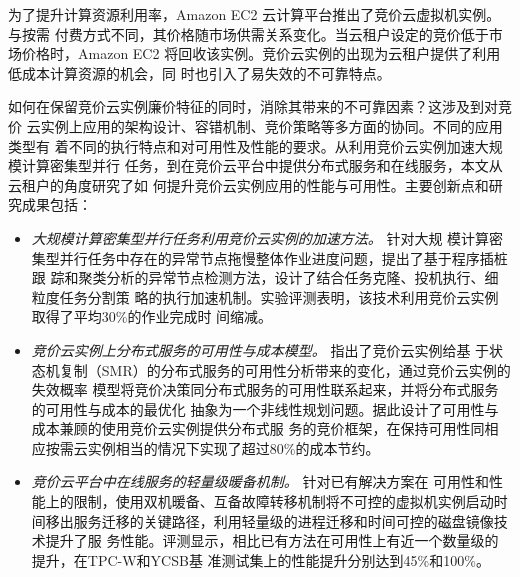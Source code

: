 \begin{cabstract}
  为了提升计算资源利用率，Amazon EC2 云计算平台推出了竞价云虚拟机实例。与按需
  付费方式不同，其价格随市场供需关系变化。当云租户设定的竞价低于市场价格时，Amazon 
  EC2 将回收该实例。竞价云实例的出现为云租户提供了利用低成本计算资源的机会，同
  时也引入了易失效的不可靠特点。

  如何在保留竞价云实例廉价特征的同时，消除其带来的不可靠因素？这涉及到对竞价
  云实例上应用的架构设计、容错机制、竞价策略等多方面的协同。不同的应用类型有
  着不同的执行特点和对可用性及性能的要求。从利用竞价云实例加速大规模计算密集型并行
  任务，到在竞价云平台中提供分布式服务和在线服务，本文从云租户的角度研究了如
  何提升竞价云实例应用的性能与可用性。主要创新点和研究成果包括：
  \begin{itemize}
    \item \emph{大规模计算密集型并行任务利用竞价云实例的加速方法。} 针对大规
    模计算密集型并行任务中存在的异常节点拖慢整体作业进度问题，提出了基于程序插桩跟
    踪和聚类分析的异常节点检测方法，设计了结合任务克隆、投机执行、细粒度任务分割策
    略的执行加速机制。实验评测表明，该技术利用竞价云实例取得了平均30\%的作业完成时
    间缩减。
    \item \emph{竞价云实例上分布式服务的可用性与成本模型。} 指出了竞价云实例给基
    于状态机复制（SMR）的分布式服务的可用性分析带来的变化，通过竞价云实例的失效概率
    模型将竞价决策同分布式服务的可用性联系起来，并将分布式服务的可用性与成本的最优化
    抽象为一个非线性规划问题。据此设计了可用性与成本兼顾的使用竞价云实例提供分布式服
    务的竞价框架，在保持可用性同相应按需云实例相当的情况下实现了超过80\%的成本节约。
    \item \emph{竞价云平台中在线服务的轻量级暖备机制。} 针对已有解决方案在
    可用性和性能上的限制，使用双机暖备、互备故障转移机制将不可控的虚拟机实例启动时
    间移出服务迁移的关键路径，利用轻量级的进程迁移和时间可控的磁盘镜像技术提升了服
    务性能。评测显示，相比已有方法在可用性上有近一个数量级的提升，在TPC-W和YCSB基
    准测试集上的性能提升分别达到45\%和100\%。
  \end{itemize}

\end{cabstract}


